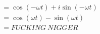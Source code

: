 \documentclass[preview]{standalone}
\begin{document}
\begin{align*}
\begin{aligned}&=\cos{(-\omega t)}+i\sin{(-\omega t)} \\ &= \cos{(\omega t)}-\sin{(\omega t)} \\ &= FUCKING \ NIGGER \end{aligned}
\end{align*}
\end{document}
